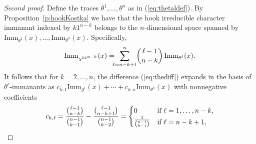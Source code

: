 \documentclass[12pt]{amsart}
\numberwithin{equation}{section}
\newcommand{\imm}[1]{\mathrm{Imm}_{#1}}
\newcommand{\sumsb}[1]{\sum_{\substack{#1}}}  %
\newcommand{\defeq}{:=}
\newcommand{\ntnsp}{\negthinspace}
\newcommand{\ntksp}{\negthickspace}
\newcommand{\nTksp}{\negthickspace\negthickspace}
\begin{document}
\begin{proof}[Second proof]
  Define the traces $\theta^1, \dotsc, \theta^n$
  as in (\ref{eq:thetaldef}).
  By Proposition~\ref{p:hookKostka}
  we have that
  the hook irreducible character immanant indexed by $k1^{n-k}$
  belongs to the $n$-dimensional space spanned by
  $\imm{\theta^1}(x), \dotsc, \imm{\theta^n}(x)$.  Specifically,
    \begin{equation}\label{eq:hookirrmon}
      \imm{\chi^{k1^{n-k}}}(x) =
      \nTksp \sum_{\ell = n-k+1}^n \ntksp \binom{\ell-1}{n-k} \, \imm{\theta^\ell}(x).
    \end{equation}
It follows that for $k = 2,\dotsc,n$, the difference (\ref{eq:thediff})
      expands in the basis of $\theta^\ell$-immanants as
      $c_{k,1} \imm{\theta^1}(x) + \cdots + c_{k,n} \imm{\theta^n}(x)$
    with nonnegative coefficients
    \begin{equation*}
        c_{k,\ell} = \frac{\binom{\ell-1}{n-k}}{\binom{n-1}{k-1}} - \frac{\binom{\ell-1}{n-k+1}}{\binom{n-1}{k-2}} = 
        \begin{cases}
        0
        &\text{if $\ell = 1,\dotsc,n-k$},\\
            \text{\raisebox{1.25mm}{$\frac{1}{\binom{n-1}{k-1}}$}} &\text{if $\ell = n-k+1$},\\

\end{cases}
\end{equation*}
\end{proof}
\end{document}
